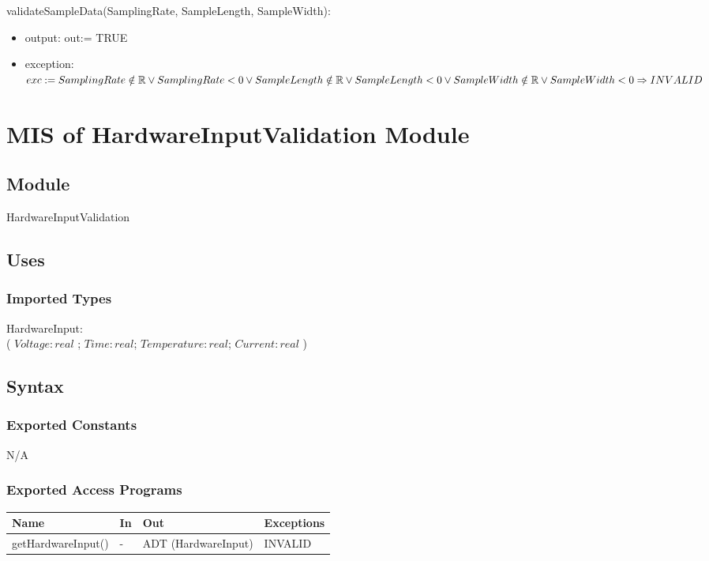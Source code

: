 \documentclass[12pt, titlepage]{article}
\begin{document}
\noindent validateSampleData(SamplingRate, SampleLength, SampleWidth):
\begin{itemize}
\item output: out:= TRUE
\item exception: $exc:= 
SamplingRate \notin \mathbb{R} \lor SamplingRate < 0 \lor \\
SampleLength \notin \mathbb{R} \lor SampleLength < 0  \lor \\
SampleWidth \notin \mathbb{R} \lor SampleWidth < 0  \\
\Rightarrow INVALID$
\end{itemize}
\newpage


\section{MIS of HardwareInputValidation Module} \label{HI}
\subsection{Module}

HardwareInputValidation

\subsection{Uses}

\subsubsection{Imported Types}
HardwareInput: \\
( $Voltage: real $ ; $Time: real$; $Temperature: real$; $Current: real$ )

\subsection{Syntax}

\subsubsection{Exported Constants}
N/A

\subsubsection{Exported Access Programs}

\begin{center}
\begin{tabular}{p{4cm} p{2cm} p{6cm} p{2cm}}
\hline
\textbf{Name} & \textbf{In} & \textbf{Out} & \textbf{Exceptions} \\
\hline
getHardwareInput() & - & ADT (HardwareInput) & INVALID \\
\hline
\end{tabular}
\end{center}
\end{document}
